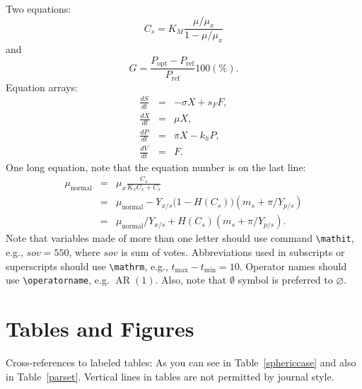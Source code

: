 \documentclass[ecta,nameyear,final,supplement]{econsocart}
\theoremstyle{plain}
\theoremstyle{definition}
\begin{document}
Two equations:
\begin{equation}
    C_{s}  =  K_{M} \frac{\mu/\mu_{x}}{1-\mu/\mu_{x}} \label{ccs}
\end{equation}
and
\begin{equation}
    G = \frac{P_{\mathrm{opt}} - P_{\mathrm{ref}}}{P_{\mathrm{ref}}}  100(\%).
\end{equation}
Equation arrays:
\begin{eqnarray}
  \frac{dS}{dt} & = & - \sigma X + s_{F} F,\\
  \frac{dX}{dt} & = &   \mu    X,\\
  \frac{dP}{dt} & = &   \pi    X - k_{h} P,\\
  \frac{dV}{dt} & = &   F.
\end{eqnarray}
One long equation, note that the equation number is on the last line:
\begin{eqnarray}
 \mu_{\text{normal}} & = & \mu_{x} \frac{C_{s}}{K_{x}C_{x}+C_{s}}  \nonumber\\
                     & = & \mu_{\text{normal}} - Y_{x/s}\bigl(1-H(C_{s})\bigr)(m_{s}+\pi /Y_{p/s})\nonumber\\
                     & = & \mu_{\text{normal}}/Y_{x/s}+ H(C_{s}) (m_{s}+ \pi /Y_{p/s}).\label{e7}
\end{eqnarray}
Note that variables made of more than one letter should use command \verb|\mathit|,
e.g., $\mathit{sov}=550$, where $\mathit{sov}$ is sum of votes. Abbreviations used in subscripts or superscripts should use \verb|\mathrm|,
e.g., $t_{\mathrm{max}}-t_{\mathrm{min}} =10$. Operator names should use \verb|\operatorname|, e.g. $\operatorname{AR}(1)$. Also, note that $\emptyset$ symbol is preferred to $\varnothing$.

\section{Tables and Figures}
Cross-references to labeled tables: As you can see in Table~\ref{sphericcase}
and also in Table~\ref{parset}. Vertical lines in tables are not permitted by journal style. 
\end{document}

